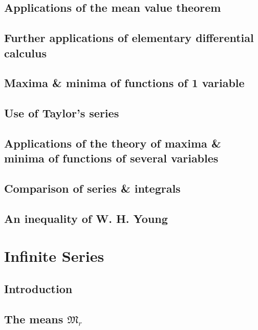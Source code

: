 \documentclass[oneside]{book}
\numberwithin{equation}{section}
\begin{document}
\subsection{Applications of the mean value theorem}

\subsection{Further applications of elementary differential calculus}

\subsection{Maxima \& minima of functions of 1 variable}

\subsection{Use of Taylor's series}

\subsection{Applications of the theory of maxima \& minima of functions of several variables}

\subsection{Comparison of series \& integrals}

\subsection{An inequality of W. H. Young}


\section{Infinite Series}

\subsection{Introduction}

\subsection{The means $\mathfrak{M}_r$}
\end{document}
